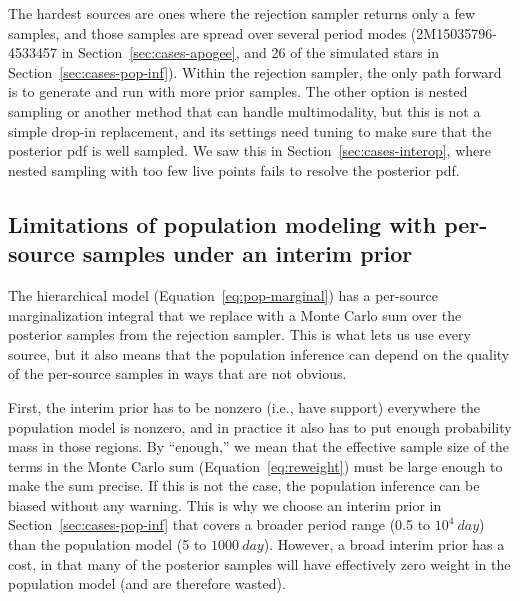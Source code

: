 \documentclass[twocolumn]{AASTeX7/aastex701}
\begin{document}
The hardest sources are ones where the rejection sampler returns only a few samples, and
those samples are spread over several period modes (2M15035796-4533457 in
Section~\ref{sec:cases-apogee}, and 26 of the simulated stars in
Section~\ref{sec:cases-pop-inf}).
Within the rejection sampler, the only path forward is to generate and run with more
prior samples.
The other option is nested sampling or another method that can handle multimodality,
but this is not a simple drop-in replacement, and its settings need tuning to make sure
that the posterior pdf is well sampled.
We saw this in Section~\ref{sec:cases-interop}, where nested sampling with too few live
points fails to resolve the posterior pdf.


\subsection{Limitations of population modeling with per-source samples under an interim prior}
\label{sec:discussion-population}

The hierarchical model (Equation~\ref{eq:pop-marginal}) has a per-source
marginalization integral that we replace with a Monte Carlo sum over the posterior
samples from the rejection sampler.
This is what lets us use every source, but it also means that the population inference
can depend on the quality of the per-source samples in ways that are not obvious.

First, the interim prior has to be nonzero (i.e., have support) everywhere the
population model is nonzero, and in practice it also has to put enough probability mass
in those regions.
By ``enough,'' we mean that the effective sample size of the terms in the Monte Carlo
sum (Equation~\ref{eq:reweight}) must be large enough to make the sum precise.
If this is not the case, the population inference can be biased without any warning.
This is why we choose an interim prior in Section~\ref{sec:cases-pop-inf} that covers a
broader period range (0.5 to $10^4~\unit{day}$) than the population model (5 to
$1000~\unit{day}$).
However, a broad interim prior has a cost, in that many of the posterior samples will
have effectively zero weight in the population model (and are therefore wasted).
\end{document}
